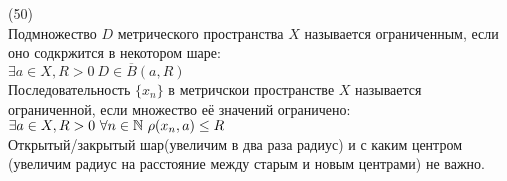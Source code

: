 (50)\\
Подмножество $D$ метрического пространства $X$ называется ограниченным, если оно содкржится в некотором шаре:\\
$\exists a \in X, R > 0\ D \in \overline{B}(a, R)$\\
Последовательность $\{x_n\}$ в метричскои пространстве $X$ называется ограниченной, если множество её значений ограничено:\\
$\exists a \in X, R > 0\ \forall n \in \N\ \rho(x_n, a) \le R$\\
Открытый/закрытый шар(увеличим в два раза радиус) и с каким центром (увеличим радиус на расстояние между старым и новым центрами) не важно.